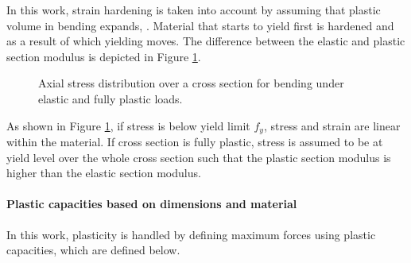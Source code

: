 \documentclass{jcgt}
\begin{document}
In this work, strain hardening is taken into account by assuming that plastic volume in bending
expands, 
\cite{dowling}.
Material that starts to yield first is hardened and as a result of which yielding moves.
%
The difference between the elastic and plastic section modulus is depicted in Figure \ref{fig:wp}.

\begin{figure}[htb!]
\centering
{}
\hspace{1cm}
\caption{Axial stress distribution over a cross section for bending under elastic and fully plastic loads.}
\label{fig:wp}
\end{figure}

As shown in Figure \ref{fig:wp}, if stress is below yield limit $f_y$, stress and strain are linear within the material.
If cross section is fully plastic, stress is assumed to be at yield level over the whole cross section such that 
the plastic section modulus is higher than the elastic section modulus.

\paragraph{Plastic capacities based on dimensions and material}
In this work, plasticity is handled by defining maximum forces using plastic capacities, which are defined below.
\end{document}
